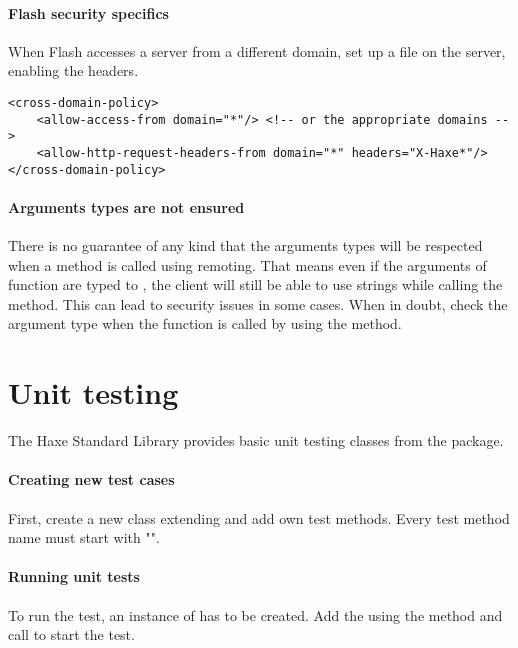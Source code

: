 \paragraph{Flash security specifics}

When Flash accesses a server from a different domain, set up a  file on the server, enabling the  headers.

\begin{lstlisting} 
<cross-domain-policy>
	<allow-access-from domain="*"/> <!-- or the appropriate domains -->
	<allow-http-request-headers-from domain="*" headers="X-Haxe*"/>
</cross-domain-policy>
\end{lstlisting} 

\paragraph{Arguments types are not ensured}

There is no guarantee of any kind that the arguments types will be respected when a method is called using remoting. 
That means even if the arguments of function  are typed to , the client will still be able to use strings while calling the method. 
This can lead to security issues in some cases. When in doubt, check the argument type when the function is called by using the  method.

\section{Unit testing}
\label{std-unit-testing}

The Haxe Standard Library provides basic unit testing classes from the  package. 

\paragraph{Creating new test cases}

First, create a new class extending  and add own test methods. Every test method name must start with "".


\paragraph{Running unit tests}
To run the test, an instance of  has to be created. Add the  using the  method and call  to start the test.

